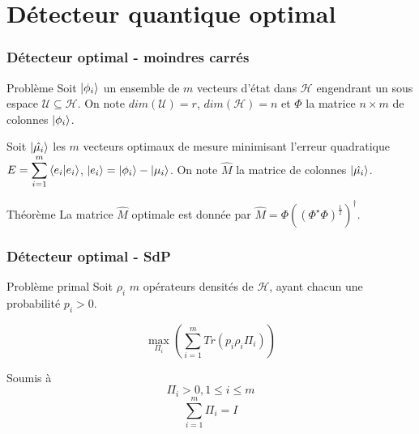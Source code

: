 \documentclass{beamer}
\begin{document}
\section[Détection optimale]{Détecteur quantique optimal}

\begin{frame}
    \frametitle{Détecteur optimal - moindres carrés}
    \begin{block}{Problème}
        Soit ${\ket{\phi_i}}$ un ensemble de $m$ vecteurs d'état dans $\mathcal{H}$ engendrant un sous espace $\mathcal{U} \subseteq \mathcal{H}$. On note $dim(\mathcal{U}) = r$, $dim(\mathcal{H}) = n$ et $\Phi$ la matrice $n \times m$ de colonnes $\ket{\phi_i}$.

        Soit ${\ket{\hat{\mu_i}}}$ les $m$ vecteurs optimaux de mesure minimisant l'erreur quadratique $E = \displaystyle \sum_{i=1}^{m} \braket{e_i|e_i}$, $\ket{e_i} = \ket{\phi_i} - \ket{\mu_i}$. On note $\hat{M}$ la matrice de colonnes $\ket{\hat{\mu_i}}$.
    \end{block}
    \begin{block}{Théorème}
        La matrice $\hat{M}$ optimale est donnée par $\hat{M} = \Phi((\Phi^{\star}\Phi)^{\frac{1}{2}}  )^{\dagger}$.

    \end{block}
\end{frame}

\begin{frame}
    \frametitle{Détecteur optimal - SdP}

    \begin{block}{Problème primal}
        Soit ${\rho_i}$ $m$ opérateurs densités de $\mathcal{H}$, ayant chacun une probabilité $p_i > 0$.

        \begin{equation}
            \max\limits_{\Pi_i} (\displaystyle \sum_{i=1}^{m} Tr(p_i \rho_i \Pi_i))
        \end{equation}

        Soumis à 
        \begin{equation*}
            \Pi_i > 0, 1 \leq i \leq m
        \end{equation*}
        \begin{equation*}
            \displaystyle \sum_{i=1}^{m} \Pi_i = I
        \end{equation*}
        
    \end{block}

\end{frame}
\end{document}
